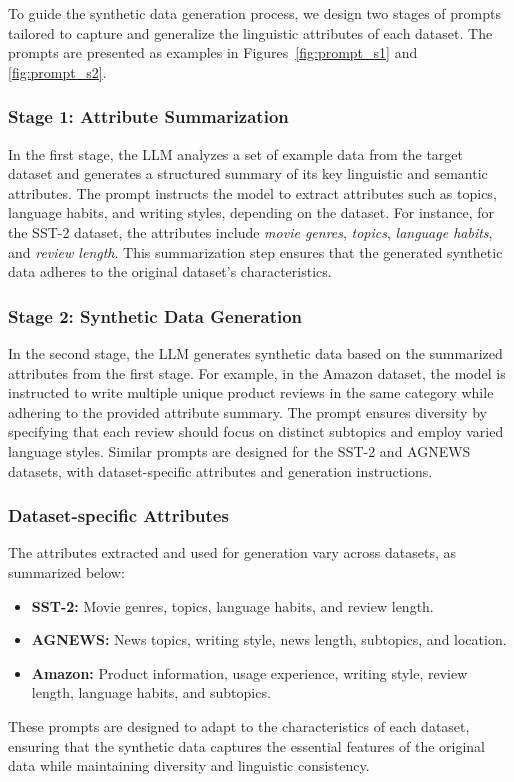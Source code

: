 To guide the synthetic data generation process, we design two stages of prompts tailored to capture and generalize the linguistic attributes of each dataset. The prompts are presented as examples in Figures~\ref{fig:prompt_s1} and \ref{fig:prompt_s2}.

\subsubsection{Stage 1: Attribute Summarization}

In the first stage, the LLM analyzes a set of example data from the target dataset and generates a structured summary of its key linguistic and semantic attributes. The prompt instructs the model to extract attributes such as topics, language habits, and writing styles, depending on the dataset. For instance, for the SST-2 dataset, the attributes include \textit{movie genres}, \textit{topics}, \textit{language habits}, and \textit{review length}. This summarization step ensures that the generated synthetic data adheres to the original dataset’s characteristics.

\subsubsection{Stage 2: Synthetic Data Generation}

In the second stage, the LLM generates synthetic data based on the summarized attributes from the first stage. For example, in the Amazon dataset, the model is instructed to write multiple unique product reviews in the same category while adhering to the provided attribute summary. The prompt ensures diversity by specifying that each review should focus on distinct subtopics and employ varied language styles. Similar prompts are designed for the SST-2 and AGNEWS datasets, with dataset-specific attributes and generation instructions.

\subsubsection{Dataset-specific Attributes}

The attributes extracted and used for generation vary across datasets, as summarized below:

\begin{itemize}
	\item \textbf{SST-2:} Movie genres, topics, language habits, and review length.
	\item \textbf{AGNEWS:} News topics, writing style, news length, subtopics, and location.
	\item \textbf{Amazon:} Product information, usage experience, writing style, review length, language habits, and subtopics.
\end{itemize}

These prompts are designed to adapt to the characteristics of each dataset, ensuring that the synthetic data captures the essential features of the original data while maintaining diversity and linguistic consistency.





